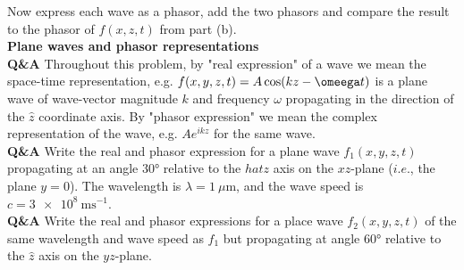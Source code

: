 \documentclass[main.tex]{subfiles}
\begin{document}
Now express each wave as a phasor, add the two phasors and compare the result to the phasor of $f(x,z,t)$ from part (b).\\

\textbf{Plane waves and phasor representations}\\
\textbf{Q\&A} Throughout this problem, by "real expression" of a wave we mean the space-time representation, e.g. $f(x,y,z,t) = A\cos(kz-\omeega t)$ is a plane wave of wave-vector magnitude $k$ and frequency $\omega$ propagating in the direction of the $\hat{z}$ coordinate axis. By "phasor expression" we mean the complex representation of the wave, e.g. $Ae^{ikz}$ for the same wave.\\

\textbf{Q\&A} Write the real and phasor expression for a plane wave $f_1(x,y,z,t)$ propagating at an angle $\ang{30}$ relative to the $hat{z}$ axis on the $xz$-plane ($i.e.$, the plane $y=0$). The wavelength is $\lambda = \SI{1}{\mu \meter}$, and the wave speed is $c = \SI{3e8}{\metre \second^{-1}}$.\\

\textbf{Q\&A} Write the real and phasor expressions for a place wave $f_2(x,y,z,t)$ of the same wavelength and wave speed as $f_1$ but propagating at angle $\ang{60}$ relative to the $\hat{z}$ axis on the $yz$-plane.
\end{document}
